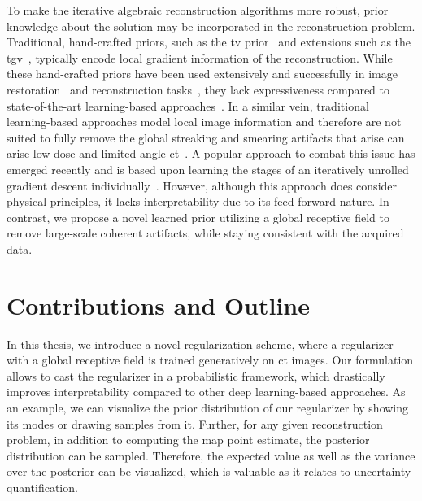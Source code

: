 \documentclass[../ml-tct.tex]{subfiles}
\begin{document}
To make the iterative algebraic reconstruction algorithms more robust, prior knowledge about the solution may be incorporated in the reconstruction problem.
Traditional, hand-crafted priors, such as the \gls{tv} prior~\cite{rudin_nonlinear_1992} and extensions such as the \gls{tgv}~\cite{bredies_total_2010}, typically encode local gradient information of the reconstruction.
While these hand-crafted priors have been used extensively and successfully in image restoration~\cite{chan_constrained_2013,getreuer_rudin_2012,rudin_nonlinear_1992} and reconstruction tasks~\cite{chen_limited_2013,liu_total_2014,zhang_few-view_2013}, they lack expressiveness compared to state-of-the-art learning-based approaches~\cite{kobler_total_2020}.
In a similar vein, traditional learning-based approaches model local image information and therefore are not suited to fully remove the global streaking and smearing artifacts that arise can arise low-dose and limited-angle \gls{ct}~\cite{barrett_artifacts_2004}.
A popular approach to combat this issue has emerged recently and is based upon learning the stages of an iteratively unrolled gradient descent individually~\cite{hammernik_deep_2017,hammernik_learning_2017}.
However, although this approach does consider physical principles, it lacks interpretability due to its feed-forward nature.
In contrast, we propose a novel learned prior utilizing a global receptive field to remove large-scale coherent artifacts, while staying consistent with the acquired data.
\section{Contributions and Outline}
In this thesis, we introduce a novel regularization scheme, where a regularizer with a global receptive field is trained generatively on \gls{ct} images.
Our formulation allows to cast the regularizer in a probabilistic framework, which drastically improves interpretability compared to other deep learning-based approaches.
As an example, we can visualize the prior distribution of our regularizer by showing its modes or drawing samples from it.
Further, for any given reconstruction problem, in addition to computing the \gls{map} point estimate, the posterior distribution can be sampled.
Therefore, the expected value as well as the variance over the posterior can be visualized, which is valuable as it relates to uncertainty quantification.
\end{document}
